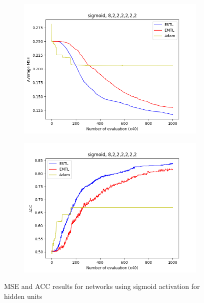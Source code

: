 \documentclass[conference]{IEEEtran}
\theoremstyle{definition}
\begin{document}
\begin{figure}
      \begin{subfigure}{0.48\linewidth}
        \centering
        \includegraphics[width=1.0\linewidth]{images/sigmoid/avg_mse8,2,2,2,2,2,2.png}
      \end{subfigure}
      \begin{subfigure}{0.48\linewidth}
        \centering
        \includegraphics[width=1.0\linewidth]{images/sigmoid/avg_acc8,2,2,2,2,2,2.png}
      \end{subfigure}

      \caption{MSE and ACC results for networks using sigmoid activation for hidden units}
    \end{figure}
\end{document}
